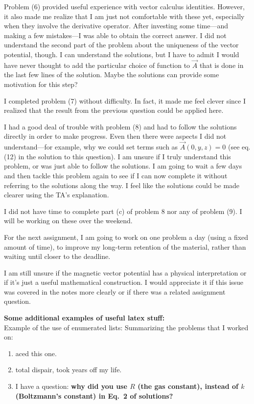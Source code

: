 \documentclass[11pt,usenames,dvipsnames]{article}
\begin{document}
Problem (6) provided useful experience with vector calculus identities.  However, it also made me realize that I am just not comfortable with these yet, especially when they involve the derivative operator.  After investing some time---and making a few mistakes---I was able to obtain the correct answer.  I did not understand the second part of the problem about the uniqueness of the vector potential, though.  I can understand the solutions, but I have to admit I would have never thought to add the particular choice of function to $\vec{A}$ that is done in the last few lines of the solution. Maybe the solutions can provide some motivation for this step?

I completed problem (7) without difficulty.  In fact, it made me feel clever since I realized that the result from the previous question could be applied here.

I had a good deal of trouble with problem (8) and had to follow the solutions directly in order to make progress.  Even then there were aspects I did not understand---for example, why we could set terms such as $\vec{A}(0,y,z)=0$ (see eq. (12) in the solution to this question).  I am unsure if I truly understand this problem, or was just able to follow the solutions.  I am going to wait a few days and then tackle this problem again to see if I can now complete it without referring to the solutions along the way. I feel like the solutions could be made clearer using the TA's explanation.

I did not have time to complete part (c) of problem 8 nor any of problem (9).  I will be working on these over the weekend.

For the next assignment, I am going to work on one problem a day (using a fixed amount of time), to improve my long-term retention of the material, rather than waiting until closer to the deadline.

I am still unsure if the magnetic vector potential has a physical interpretation or if it's just a useful mathematical construction. I would appreciate it if this issue was covered in the notes more clearly or if there was a related assignment question.

\newpage

\noindent
{\bf Some additional examples of useful latex stuff:}\\

\noindent
Example of the use of enumerated lists:  Summarizing the problems that I worked on:
\begin{enumerate} \itemsep0em
\item aced this one.
\item total dispair, took years off my life.
\item I have a question: \textbf{why did you use $R$ (the gas constant), instead of $k$ (Boltzmann's constant) in Eq.~2 of solutions?}
\end{enumerate}
\end{document}
